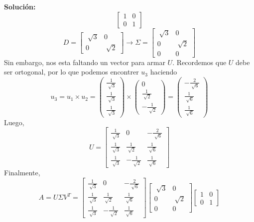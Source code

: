\documentclass[12pt]{article}
\newenvironment{solucion}
{\begin{mdframed}[backgroundcolor=black!10]
		{\bf Solución:}\\
	}
	{
	\end{mdframed}
}
\newenvironment{preguntas}
{\begin{enumerate}\itemsep12pt
	}
	{
	\end{enumerate}
}
\newcommand{\ra}{\rightarrow}
\begin{document}
\begin{preguntas}
\begin{solucion}
$$\begin{bmatrix}
1 & 0 \\
0 & 1
\end{bmatrix}$$
$$D = \begin{bmatrix}
\sqrt[]{3} & 0 \\
0 & \sqrt[]{2}
\end{bmatrix} \ra \Sigma = \begin{bmatrix}
\sqrt[]{3} & 0 \\
0 & \sqrt[]{2}\\
0 & 0
\end{bmatrix}$$
Sin embargo, nos esta faltando un vector para armar $U$. Recordemos que $U$ debe ser ortogonal, por lo que podemos encontrer $u_3$ haciendo
$$u_3 = u_1 \times u_2 = \begin{pmatrix}
\frac{1}{\sqrt[]{3}} \\
\frac{1}{\sqrt[]{3}} \\
\frac{1}{\sqrt[]{3}}
\end{pmatrix} \times 
\begin{pmatrix}
0 \\
\frac{1}{\sqrt[]{2}} \\
-\frac{1}{\sqrt[]{2}}
\end{pmatrix} =
\begin{pmatrix}
-\frac{2}{\sqrt[]{6}} \\
\frac{1}{\sqrt[]{6}} \\
\frac{1}{\sqrt[]{6}}
\end{pmatrix}
$$
Luego,
$$U = \begin{bmatrix}
\frac{1}{\sqrt[]{3}} & 0 & -\frac{2}{\sqrt[]{6}}\\
\frac{1}{\sqrt[]{3}} & \frac{1}{\sqrt[]{2}} & \frac{1}{\sqrt[]{6}} \\
\frac{1}{\sqrt[]{3}} &-\frac{1}{\sqrt[]{2}} & \frac{1}{\sqrt[]{6}}
\end{bmatrix}$$
Finalmente,
$$A = U\Sigma V^T =
\begin{bmatrix}
\frac{1}{\sqrt[]{3}} & 0 & -\frac{2}{\sqrt[]{6}}\\
\frac{1}{\sqrt[]{3}} & \frac{1}{\sqrt[]{2}} & \frac{1}{\sqrt[]{6}} \\
\frac{1}{\sqrt[]{3}} &-\frac{1}{\sqrt[]{2}} & \frac{1}{\sqrt[]{6}}
\end{bmatrix}
\begin{bmatrix}
\sqrt[]{3} & 0 \\
0 & \sqrt[]{2}\\
0 & 0
\end{bmatrix}
\begin{bmatrix}
1 & 0 \\
0 & 1
\end{bmatrix}
$$
\end{solucion}
\end{preguntas}
\end{document}

